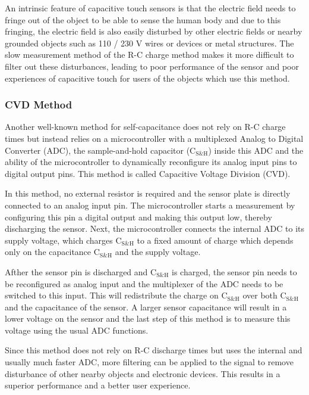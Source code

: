 \documentclass{sigchi-ext}
\begin{document}
An intrinsic feature of capacitive touch sensors is that the
electric field needs to fringe out of the object to be able to sense the human
body and due to this fringing, the electric field is also easily disturbed by
other electric fields or nearby grounded objects such as 110 / 230 V wires or
devices or metal structures. The slow measurement method of the R-C charge
method makes it more difficult to filter out these disturbances, leading to poor
performance of the sensor and poor experiences of capacitive touch for users of
the objects which use this method.

\subsubsection{CVD Method}
Another well-known method for self-capacitance does not rely on R-C charge times
but instead relies on a microcontroller with a multiplexed Analog to Digital
Converter (ADC), the sample-and-hold capacitor ($\textrm{C}_{\textrm{S\&H}}$)
inside this ADC and the ability of the microcontroller to dynamically
reconfigure its analog input pins to digital output pins. This method is called
Capacitive Voltage Division (CVD).

In this method, no external resistor is required and the sensor plate is
directly connected to an analog input pin. The microcontroller starts a
measurement by configuring this pin a digital output and making this output low,
thereby discharging the sensor. Next, the microcontroller connects the internal
ADC to its supply voltage, which charges $\textrm{C}_{\textrm{S\&H}}$ to a fixed
amount of charge which depends only on the capacitance
$\textrm{C}_{\textrm{S\&H}}$ and the supply voltage.

Afther the sensor pin is discharged and $\textrm{C}_{\textrm{S\&H}}$ is
charged, the sensor pin needs to be reconfigured as analog input and the
multiplexer of the ADC needs to be switched to this input. This will
redistribute the charge on $\textrm{C}_{\textrm{S\&H}}$ over both
$\textrm{C}_{\textrm{S\&H}}$ and the capacitance of the sensor. A larger sensor
capacitance will result in a lower voltage on the sensor and the last step of
this method is to measure this voltage using the usual ADC functions.

Since this method does not rely on R-C discharge times but uses the internal and
usually much faster ADC, more filtering can be applied to the signal to remove
disturbance of other nearby objects and electronic devices. This results in a
superior performance and a better user experience.
\end{document}

